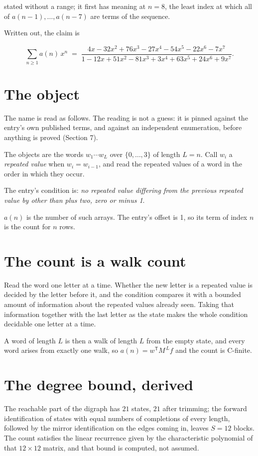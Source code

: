 \documentclass[11pt]{article}
\theoremstyle{definition}
\begin{document}
stated without a range; it first has meaning at $n = 8$, the least index at which all of $a(n-1),\dots,a(n-7)$ are terms of the sequence.

Written out, the claim is

\[\sum_{n \ge 1} a(n)\,x^n \;=\; \frac{4x - 32x^{2} + 76x^{3} - 27x^{4} - 54x^{5} - 22x^{6} - 7x^{7}}{1 - 12x + 51x^{2} - 81x^{3} + 3x^{4} + 63x^{5} + 24x^{6} + 9x^{7}}.\]

\section{The object}

The name is read as follows. The reading is not a guess: it is pinned against the entry's own published terms, and against an independent enumeration, before anything is proved (Section 7).

The objects are the words $w_1\cdots w_L$ over $\{0,\dots,3\}$ of length $L = n$. Call $w_i$ a {\itshape repeated value} when $w_i = w_{i-1}$, and read the repeated values of a word in the order in which they occur.

The entry's condition is: {\itshape no repeated value differing from the previous repeated value by other than plus two, zero or minus 1}.

$a(n)$ is the number of such arrays. The entry's offset is 1, so its term of index $n$ is the count for $n$ rows.

\section{The count is a walk count}

Read the word one letter at a time. Whether the new letter is a repeated value is decided by the letter before it, and the condition compares it with a bounded amount of information about the repeated values already seen. Taking that information together with the last letter as the state makes the whole condition decidable one letter at a time.

A word of length $L$ is then a walk of length $L$ from the empty state, and every word arises from exactly one walk, so $a(n) = w^{\mathsf T}M^{\,L}f$ and the count is C-finite.

\section{The degree bound, derived}

The reachable part of the digraph has $21$ states, $21$ after trimming; the forward identification of states with equal numbers of completions of every length, followed by the mirror identification on the edges coming in, leaves $S = 12$ blocks. The count satisfies the linear recurrence given by the characteristic polynomial of that $12\times12$ matrix, and that bound is computed, not assumed.
\end{document}

